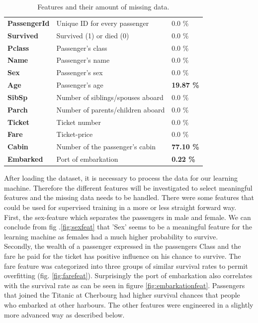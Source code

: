 \begin{table}
\caption{Features and their amount of missing data.}
\begin{tabular}{>{\bfseries}l l l}
PassengerId & Unique ID for every passenger & 0.0 \%\\
Survived & Survived (1) or died (0) & 0.0 \% \\
Pclass & Passenger's class & 0.0 \% \\
Name & Passenger's name & 0.0 \% \\
Sex & Passenger's sex & 0.0 \% \\
Age & Passenger's age & \textbf{19.87 \%} \\
SibSp & Number of siblings/spouses aboard & 0.0 \% \\
Parch & Number of parents/children aboard & 0.0 \% \\
Ticket & Ticket number & 0.0 \% \\
Fare & Ticket-price & 0.0 \% \\
Cabin & Number of the passenger's cabin & \textbf{77.10 \%} \\
Embarked & Port of embarkation & \textbf{0.22 \%} \\
\end{tabular}
\centering
\label{tab:features}
\end{table}

After loading the dataset, it is necessary to process the data for our learning machine. Therefore the different features will be investigated to select meaningful features and the missing data needs to be handled. There were some features that could be used for supervised training in a more or less straight forward way. First, the sex-feature which separates the passengers in male and female. We can conclude from fig .\ref{fig:sexfeat} that 'Sex' seems to be a meaningful feature for the learning machine as females had a much higher probability to survive.\\
Secondly, the wealth of a passenger expressed in the passengers Class and the fare he paid for the ticket has positive influence on his chance to survive. The fare feature was categorized into three groups of similar survival rates to permit overfitting (fig. \ref{fig:farefeat}). Surprisingly the port of embarkation also correlates with the survival rate as can be seen in figure \ref{fig:embarkationfeat}. Passengers that joined the Titanic at Cherbourg had higher survival chances that people who embarked at other harbours. The other features were engineered in a slightly more advanced way as described below.

